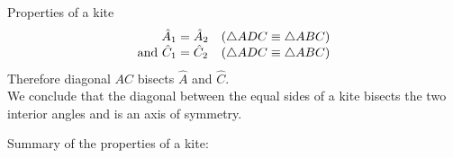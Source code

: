 \begin{wex}{Properties of a kite}
{
\begin{equation*}
  \begin{array}{r@{\;}l@{\quad}l}
    \hat{A}_{1} &= \hat{A}_{2} & \mbox{($\triangle ADC \equiv \triangle ABC$)} \\ 
    \mbox{and } \hat{C}_{1} &= \hat{C}_{2} &  \mbox{($\triangle ADC \equiv \triangle ABC$)}\\ 
  \end{array}
\end{equation*}
Therefore diagonal $AC$ bisects $\hat{A}$ and $\hat{C}$. \\
We conclude that the diagonal between the equal sides of a kite bisects the two interior angles and is an axis of symmetry.
}
\end{wex}
\clearpage
Summary of the properties of a kite:
